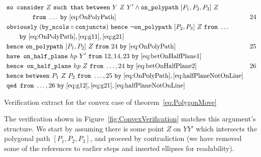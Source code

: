\begin{boxedfigure}
\small
\begin{align*}
&\code{so consider}\ Z\ \code{such that}\ \between{Y}{Z}{Y'} \wedge \code{on\_polypath}\ [P_1,P_2,P_3]\ Z\\\
&\qquad\qquad\code{from}\ \ldots\ \code{by}\ \eqref{eq:OnPolyPath} & 24\\
&\code{obviously}\ (\code{by\_ncols}\circ\code{conjuncts})\ \code{hence}\ \neg\code{on\_polypath}\ [P_2,P_3]\ Z\ \code{from}\ \ldots\\
&\qquad\code{by}\ \eqref{eq:OnPolyPath},\eqref{eq:g11},\eqref{eq:g21}\\
&\code{hence}\ \code{on\_polypath}\ [P_1,P_2]\ Z\ \code{from}\ 24\ \code{by}\ \eqref{eq:OnPolyPath}&25\\
&\code{have on\_half\_plane}\ hp\ Y'\ \code{from}\ 12,14,23\ \code{by}\ \eqref{eq:betOnHalfPlane1}\\
&\code{hence on\_half\_plane}\ hp\ Z\ \code{from}\ \ldots,24\ \code{by}\ \eqref{eq:betOnHalfPlane2} & 26\\
&\code{hence}\ \between{P_1}{Z}{P_2}\ \code{from}\ \ldots,25\ \code{by}\ \eqref{eq:OnPolyPath},\eqref{eq:halfPlaneNotOnLine}\\
&\code{qed from}\ \ldots,26\ \code{by}\ \eqref{eq:g12},\eqref{eq:g21},\eqref{eq:halfPlaneNotOnLine}
\end{align*}
\caption{Verification extract for the convex case of theorem~\ref{eq:PolygonMove}}
\label{fig:ConvexVerification}
\end{boxedfigure}

The verification shown in Figure~\ref{fig:ConvexVerification} matches this argument's structure.  We start by assuming there is some point $Z$ on $YY'$ which intersects the polygonal path $[P_1,P_2,P_3]$, and proceed by contradiction (we have removed some of the references to earlier steps and inserted ellipses for readability). 

